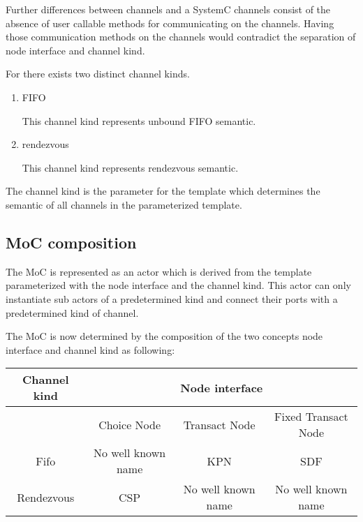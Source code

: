 Further differences between \SysteMoC{} channels and a SystemC channels consist of the
absence of user callable methods for communicating on the \SysteMoC{} channels.
Having those communication methods on the channels would contradict the separation
of node interface and channel kind.

For \SysteMoCV{} there exists two distinct channel kinds.

\begin{enumerate}
\item FIFO

This channel kind represents unbound FIFO semantic.


\item rendezvous

This channel kind represents rendezvous semantic.

\end{enumerate}

The channel kind is the parameter for the
 template which determines
the semantic of all channels in the parameterized
 template.


\subsection{MoC composition}

The MoC is represented as an actor which is derived from the 
template parameterized with the node interface and the channel kind. This actor can only
instantiate sub actors of a predetermined kind and connect their ports with a  predetermined
kind of channel.

The MoC is now determined by the composition of the two concepts node interface
and channel kind as following:

\begin{tabular}{|c||c|c|c|}
\hline
 Channel kind & \multicolumn{3}{c|}{ Node interface } \\
\hline
              & Choice Node         & Transact Node      & Fixed Transact Node \\
\hline \hline
 Fifo         & No well known name  & KPN                & SDF \\
\hline
 Rendezvous   & CSP                 & No well known name & No well known name \\
\hline
\end{tabular}

\clearpage
\appendix




